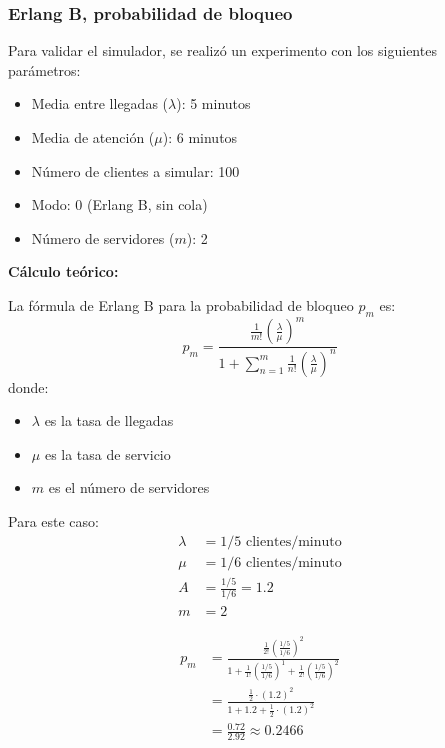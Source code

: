 \documentclass{article}
\begin{document}
\subsubsection{Erlang B, probabilidad de bloqueo}\label{subsec:erlang_b_prob_bloq}

Para validar el simulador, se realizó un experimento con los siguientes parámetros:

\begin{itemize}
    \item Media entre llegadas ($\lambda$): 5 minutos
    \item Media de atención ($\mu$): 6 minutos
    \item Número de clientes a simular: 100
    \item Modo: 0 (Erlang B, sin cola)
    \item Número de servidores ($m$): 2
\end{itemize}

\textbf{Cálculo teórico:}

La fórmula de Erlang B para la probabilidad de bloqueo $p_m$ es:
\begin{equation*}
p_m = \frac{\frac{1}{m!}\left(\frac{\lambda}{\mu}\right)^m}{1 + \sum_{n=1}^{m} \frac{1}{n!}\left(\frac{\lambda}{\mu}\right)^n}
\end{equation*}
donde:
\begin{itemize}
    \item $\lambda$ es la tasa de llegadas
    \item $\mu$ es la tasa de servicio
    \item $m$ es el número de servidores
\end{itemize}

Para este caso:
\begin{align*}
    \lambda &= 1/5 \text{ clientes/minuto} \\
    \mu &= 1/6 \text{ clientes/minuto} \\
    A &= \frac{1/5}{1/6} = 1.2 \\
    m &= 2
\end{align*}

\begin{align*}
p_m &= \frac{\frac{1}{2!}\left(\frac{1/5}{1/6}\right)^2}{1 + \frac{1}{1!}\left(\frac{1/5}{1/6}\right)^1 + \frac{1}{2!}\left(\frac{1/5}{1/6}\right)^2} \\
    &= \frac{\frac{1}{2}\cdot(1.2)^2}{1 + 1.2 + \frac{1}{2}\cdot(1.2)^2} \\
    &= \frac{0.72}{2.92} \approx 0.2466
\end{align*}
\end{document}
